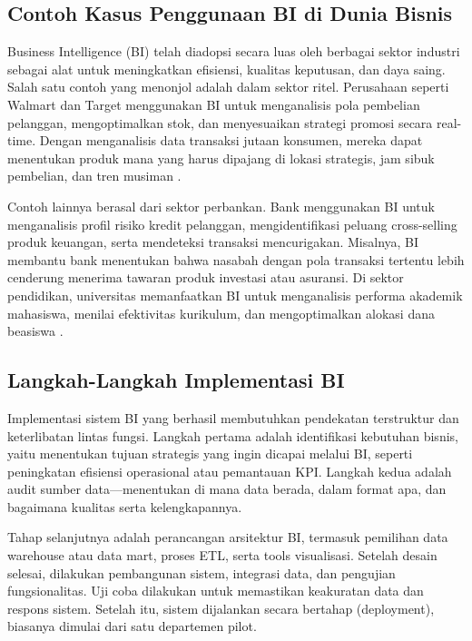 \subsection{Contoh Kasus Penggunaan BI di Dunia Bisnis}

Business Intelligence (BI) telah diadopsi secara luas oleh berbagai sektor industri sebagai alat untuk meningkatkan efisiensi, kualitas keputusan, dan daya saing. Salah satu contoh yang menonjol adalah dalam sektor ritel. Perusahaan seperti Walmart dan Target menggunakan BI untuk menganalisis pola pembelian pelanggan, mengoptimalkan stok, dan menyesuaikan strategi promosi secara real-time. Dengan menganalisis data transaksi jutaan konsumen, mereka dapat menentukan produk mana yang harus dipajang di lokasi strategis, jam sibuk pembelian, dan tren musiman \cite{petrini2005biimpact}.

Contoh lainnya berasal dari sektor perbankan. Bank menggunakan BI untuk menganalisis profil risiko kredit pelanggan, mengidentifikasi peluang cross-selling produk keuangan, serta mendeteksi transaksi mencurigakan. Misalnya, BI membantu bank menentukan bahwa nasabah dengan pola transaksi tertentu lebih cenderung menerima tawaran produk investasi atau asuransi. Di sektor pendidikan, universitas memanfaatkan BI untuk menganalisis performa akademik mahasiswa, menilai efektivitas kurikulum, dan mengoptimalkan alokasi dana beasiswa \cite{herschel2014appliedbi}.

\subsection{Langkah-Langkah Implementasi BI}

Implementasi sistem BI yang berhasil membutuhkan pendekatan terstruktur dan keterlibatan lintas fungsi. Langkah pertama adalah identifikasi kebutuhan bisnis, yaitu menentukan tujuan strategis yang ingin dicapai melalui BI, seperti peningkatan efisiensi operasional atau pemantauan KPI. Langkah kedua adalah audit sumber data—menentukan di mana data berada, dalam format apa, dan bagaimana kualitas serta kelengkapannya.

Tahap selanjutnya adalah perancangan arsitektur BI, termasuk pemilihan data warehouse atau data mart, proses ETL, serta tools visualisasi. Setelah desain selesai, dilakukan pembangunan sistem, integrasi data, dan pengujian fungsionalitas. Uji coba dilakukan untuk memastikan keakuratan data dan respons sistem. Setelah itu, sistem dijalankan secara bertahap (deployment), biasanya dimulai dari satu departemen pilot.

